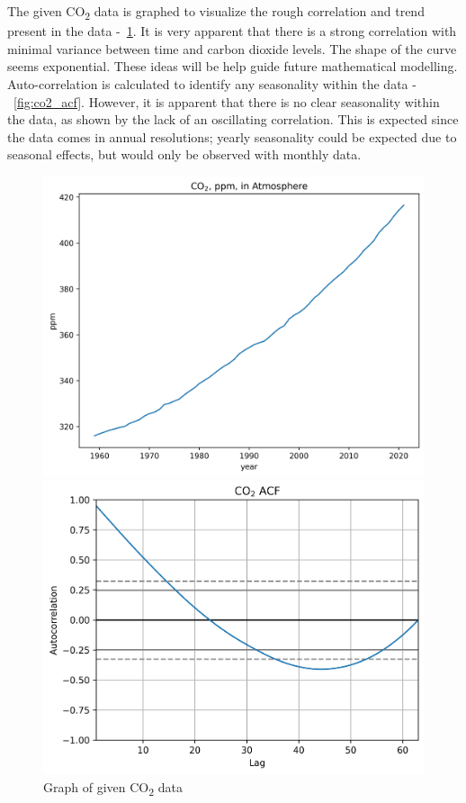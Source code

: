 \documentclass{mcmthesis}
\begin{document}
    The given CO\textsubscript{2} data is graphed to visualize the rough correlation and trend present in the data -~\ref{fig:co2}. It is very apparent that there is a strong correlation with minimal variance between time and carbon dioxide levels. The shape of the curve seems exponential. These ideas will be help guide future mathematical modelling.
    Auto-correlation is calculated to identify any seasonality within the data -~\ref{fig:co2_acf}. However, it is apparent that there is no clear seasonality within the data, as shown by the lack of an oscillating correlation. This is expected since the data comes in annual resolutions; yearly seasonality could be expected due to seasonal effects, but would only be observed with monthly data.

    \begin{figure}[h]
        \centering
        \begin{minipage}{.5\textwidth}
            \centering
            \includegraphics[width=\textwidth]{co2}%
            \caption{Graph of given CO\textsubscript{2} data}
            \label{fig:co2}
        \end{minipage}%
        \begin{minipage}{.5\textwidth}
            \centering
            \includegraphics[width=\textwidth]{co2_acf}%

\end{minipage}
\end{figure}
\end{document}
